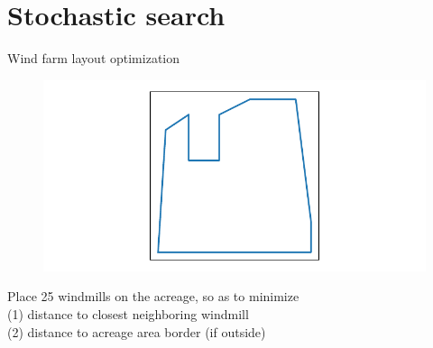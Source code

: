 \documentclass[12pt, aspectratio=149]{beamer}
\theoremstyle{plain}
\begin{document}
\section{Stochastic search}

\begin{frame}[fragile]{Wind farm layout optimization}
\vspace*{-1em}
\begin{center}
 \begin{figure}
    	\centering
    	\includegraphics[width=0.99\linewidth]{figures/windfarm}
 \end{figure}
 \end{center}
\vspace*{-2em}
\begin{center}
Place 25 windmills on the acreage, so as to minimize \\
(1) distance to closest neighboring windmill \\
(2) distance to acreage area border (if outside)
\end{center}
\end{frame}
\end{document}
